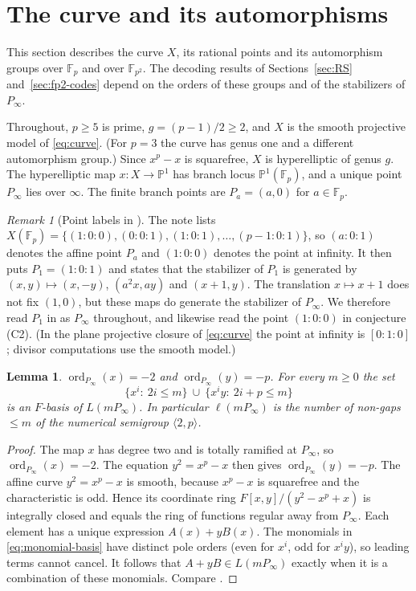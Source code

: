 \documentclass[12pt,letterpaper]{article}
\newtheorem{lemma}[theorem]{Lemma}
\theoremstyle{definition}
\theoremstyle{remark}
\newtheorem{remark}[theorem]{Remark}
\numberwithin{equation}{section}
\newcommand{\F}{\mathbb{F}}
\newcommand{\PP}{\mathbb{P}}
\newcommand{\ord}{\operatorname{ord}}
\begin{document}
\section{The curve and its automorphisms}\label{sec:curve}

This section describes the curve $X$, its rational points and its
automorphism groups over $\F_p$ and over $\F_{p^2}$. The decoding
results of Sections~\ref{sec:RS} and~\ref{sec:fp2-codes} depend on the
orders of these groups and of the stabilizers of $P_\infty$.

Throughout, $p\ge5$ is prime, $g=(p-1)/2\ge2$, and $X$ is the smooth
projective model of \eqref{eq:curve}.  (For $p=3$ the curve has genus one
and a different automorphism group.)  Since $x^p-x$ is squarefree, $X$ is
hyperelliptic of genus $g$.  The hyperelliptic map $x:X\to\PP^1$ has
branch locus $\PP^1(\F_p)$, and a unique point $P_\infty$ lies over
$\infty$.  The finite branch points are $P_a=(a,0)$ for $a\in\F_p$.

\begin{remark}[Point labels in \cite{Jo05}]\label{rem:original-notation}
The note \cite{Jo05} lists
$X(\F_p)=\{(1:0:0),(0:0:1),(1:0:1),\dots,(p-1:0:1)\}$, so $(a:0:1)$
denotes the affine point $P_a$ and $(1:0:0)$ denotes the point at
infinity.  It then puts $P_1=(1:0:1)$ and states that the stabilizer of
$P_1$ is generated by $(x,y)\mapsto(x,-y)$, $(a^2x,ay)$ and $(x+1,y)$.
The translation $x\mapsto x+1$ does not fix $(1,0)$, but these maps do
generate the stabilizer of $P_\infty$.  We therefore read $P_1$ in
\cite{Jo05} as $P_\infty$ throughout, and likewise read the point
$(1:0:0)$ in conjecture (C2).  (In the plane projective closure of
\eqref{eq:curve} the point at infinity is $[0:1:0]$; divisor computations
use the smooth model.)
\end{remark}

\begin{lemma}\label{lem:poles}
$\ord_{P_\infty}(x)=-2$ and $\ord_{P_\infty}(y)=-p$.  For every $m\ge0$
the set
\begin{equation}\label{eq:monomial-basis}
\{x^i:\ 2i\le m\}\ \cup\ \{x^iy:\ 2i+p\le m\}
\end{equation}
is an $F$-basis of $L(mP_\infty)$.  In particular $\ell(mP_\infty)$ is the
number of non-gaps $\le m$ of the numerical semigroup
$\langle2,p\rangle$.
\end{lemma}
\begin{proof}
The map $x$ has degree two and is totally ramified at $P_\infty$, so
$\ord_{P_\infty}(x)=-2$.  The equation $y^2=x^p-x$ then gives
$\ord_{P_\infty}(y)=-p$.  The affine curve $y^2=x^p-x$ is smooth,
because $x^p-x$ is squarefree and the characteristic is odd.  Hence its
coordinate ring $F[x,y]/(y^2-x^p+x)$ is integrally closed and equals the
ring of functions regular away from $P_\infty$.  Each element has a unique
expression $A(x)+yB(x)$.  The monomials in \eqref{eq:monomial-basis}
have distinct pole orders (even for $x^i$, odd for $x^iy$), so leading
terms cannot cancel.  It follows that $A+yB\in L(mP_\infty)$ exactly when
it is a combination of these monomials.  Compare
\cite[Prop.~VI.4.1]{St93}.
\end{proof}
\end{document}
